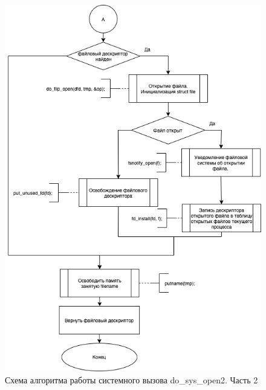 \documentclass[12pt]{report}
\begin{document}
\begin{figure}[h!]
            \centering
            \includegraphics[scale=0.7]{do_sys_open_2.png}
            \caption{Схема алгоритма работы системного вызова do\_sys\_open2. Часть 2}
            \label{png:testing:result}
\end{figure}
\end{document}
